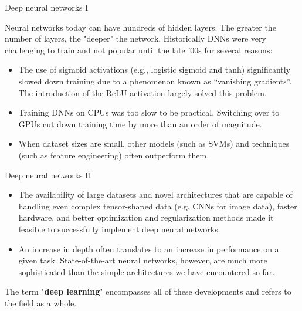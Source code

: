 \documentclass[11pt,compress,t,notes=noshow, xcolor=table]{beamer}
\begin{document}
\begin{framei}{Deep neural networks I}

\item Neural networks today can have %
hundreds of hidden layers. The greater the number of layers, the "deeper" the network. Historically %
DNNs were very challenging to train and not popular until the late '00s for several reasons:
\vfill

\begin{itemize}
\item %
The use of sigmoid activations (e.g., logistic sigmoid and tanh) significantly slowed down training due to a phenomenon known as \enquote{vanishing gradients}. The introduction of the ReLU activation largely solved this problem.
\item Training DNNs on CPUs was too slow to be practical. Switching over to GPUs cut down training time by more than an order of magnitude.
\item When dataset sizes are small, other models (such as SVMs) and techniques (such as feature engineering) often outperform them. 
\end{itemize}

\end{framei}

\begin{framei}[sep=L]{Deep neural networks II}

\begin{itemize}
\item The availability of large datasets and novel architectures that are capable of handling even complex tensor-shaped data (e.g. CNNs for image data), faster hardware, and better optimization and regularization methods made it feasible to successfully implement deep neural networks.%

\item An increase in depth often translates to an increase in performance on a given task. State-of-the-art neural networks, however, are much more sophisticated than the simple architectures we have encountered so far.
\end{itemize}

\item The term "\textbf{deep learning}" encompasses all of these developments and refers to the field as a whole.
\end{framei}

\endlecture
\end{document}
